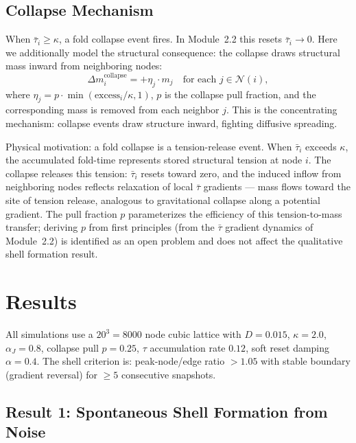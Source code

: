 \documentclass[12pt]{article}
\newcommand{\taubar}{\bar{\tau}}
\begin{document}
\subsection{Collapse Mechanism}

When $\taubar_i \geq \kappa$, a fold collapse event fires.
In Module~2.2 this resets $\taubar_i \to 0$. Here we additionally
model the structural consequence: the collapse draws structural
mass inward from neighboring nodes:
\begin{equation}
  \Delta m_i^{\mathrm{collapse}} = +\eta_j \cdot m_j
  \quad \text{for each } j \in \mathcal{N}(i),
  \label{eq:collapse}
\end{equation}
where $\eta_j = p \cdot \min(\mathrm{excess}_i/\kappa, 1)$,
$p$ is the collapse pull fraction, and the corresponding mass
is removed from each neighbor $j$. This is the concentrating
mechanism: collapse events draw structure inward, fighting
diffusive spreading.

Physical motivation: a fold collapse is a tension-release event.
When $\taubar_i$ exceeds $\kappa$, the accumulated fold-time
represents stored structural tension at node $i$.
The collapse releases this tension: $\taubar_i$ resets toward zero,
and the induced inflow from neighboring nodes reflects relaxation
of local $\taubar$ gradients --- mass flows toward the site of
tension release, analogous to gravitational collapse along a
potential gradient.
The pull fraction $p$ parameterizes the efficiency of this
tension-to-mass transfer; deriving $p$ from first principles
(from the $\taubar$ gradient dynamics of Module~2.2) is
identified as an open problem and does not affect the
qualitative shell formation result.

\section{Results}

All simulations use a $20^3 = 8000$ node cubic lattice with
$D=0.015$, $\kappa=2.0$, $\alpha_J=0.8$, collapse pull $p=0.25$,
$\tau$ accumulation rate $0.12$, soft reset damping $\alpha=0.4$.
The shell criterion is: peak-node/edge ratio $> 1.05$ with stable
boundary (gradient reversal) for $\geq 5$ consecutive snapshots.

\subsection{Result 1: Spontaneous Shell Formation from Noise}
\end{document}
